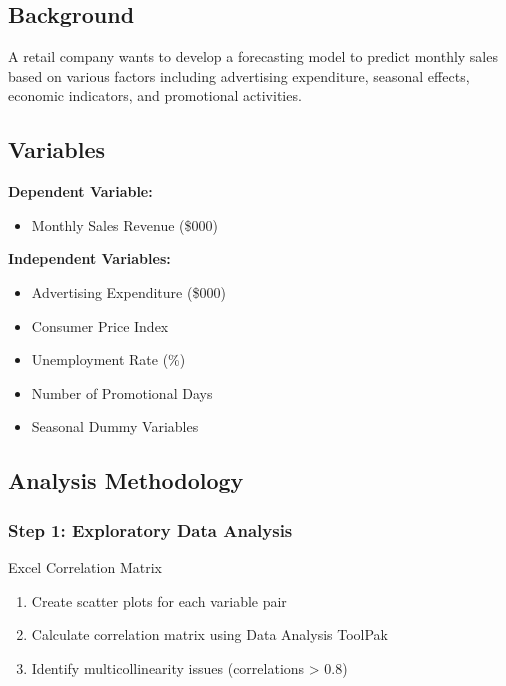 \documentclass[12pt,a4paper]{book}
\begin{document}
{{\subsection{Background}

A retail company wants to develop a forecasting model to predict monthly sales based on various factors including advertising expenditure, seasonal effects, economic indicators, and promotional activities.

\subsection{Variables}

\textbf{Dependent Variable:}
\begin{itemize}
    \item Monthly Sales Revenue (\$000)
\end{itemize}

\textbf{Independent Variables:}
\begin{itemize}
    \item Advertising Expenditure (\$000)
    \item Consumer Price Index
    \item Unemployment Rate (\%)
    \item Number of Promotional Days
    \item Seasonal Dummy Variables
\end{itemize}

\subsection{Analysis Methodology}

\subsubsection{Step 1: Exploratory Data Analysis}

\begin{example}{Excel Correlation Matrix}
\begin{enumerate}
    \item Create scatter plots for each variable pair
    \item Calculate correlation matrix using Data Analysis ToolPak
    \item Identify multicollinearity issues (correlations > 0.8)
\end{enumerate}
\end{example}

}}
\end{document}
